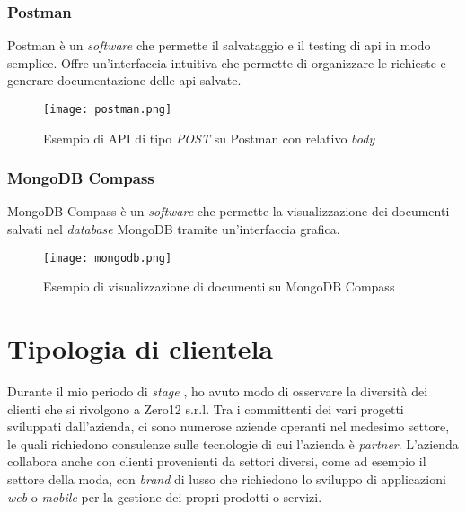 \subsubsection{Postman}
Postman è un \textit{software} che permette il salvataggio e il testing di \gls{api} in modo semplice. Offre un'interfaccia intuitiva che permette di organizzare le richieste e generare documentazione delle \gls{api} salvate.
\begin{figure}[H]
    \centering
    \texttt{[image: postman.png]}
    \caption{Esempio di API di tipo \textit{POST} su Postman con relativo \textit{body}}
    \label{fig:Postman}
\end{figure} 

\subsubsection{MongoDB Compass}
MongoDB Compass è un \textit{software} che permette la visualizzazione dei documenti salvati nel \textit{database} MongoDB tramite un'interfaccia grafica.
\begin{figure}[H]
    \centering
    \texttt{[image: mongodb.png]}
    \caption{Esempio di visualizzazione di documenti su MongoDB Compass}
    \label{fig:MongoDB}
\end{figure} 



\section{Tipologia di clientela}
Durante il mio periodo di \textit{stage} , ho avuto modo di osservare la diversità dei clienti che si rivolgono a Zero12 s.r.l. Tra i committenti dei vari progetti sviluppati dall'azienda, ci sono numerose aziende operanti nel medesimo settore, le quali richiedono consulenze sulle tecnologie di cui l'azienda è \textit{partner}.
L'azienda collabora anche con clienti provenienti da settori diversi, come ad esempio il settore della moda, con \textit{brand} di lusso che richiedono lo sviluppo di applicazioni \textit{web} o \textit{mobile} per la gestione dei propri prodotti o servizi.

